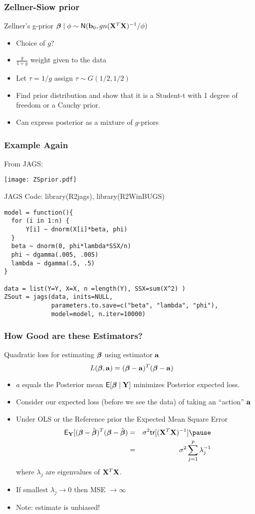 \documentclass[]{beamer}
\begin{document}
\begin{frame}
  \frametitle{Zellner-Siow prior}
Zellner's g-prior $\boldsymbol{\beta} \mid \phi \sim \textsf{N}(\mathbf{b}_0, g n 
    (\mathbf{X}^T\mathbf{X})^{-1}/\phi)$ \pause

\begin{itemize}
\item Choice of $g$?  \pause
\item $\frac{g}{1 + g}$  weight given to the data \pause
\item Let $\tau = 1/g$ assign $\tau \sim G(1/2, 1/2)$
\item Find prior distribution and show that it is a Student-t with 1
  degree of freedom or a Cauchy prior.
\item Can express posterior as a mixture of $g$-priors
\end{itemize}
\end{frame}

\begin{frame} \frametitle{Example Again}
  From JAGS:

\texttt{[image: ZSprior.pdf]}

\end{frame}

\begin{frame}[fragile]{JAGS Code: library(R2jags), library(R2WinBUGS)}
\begin{verbatim}
model = function(){
  for (i in 1:n) {
      Y[i] ~ dnorm(X[i]*beta, phi)
  }
  beta ~ dnorm(0, phi*lambda*SSX/n)
  phi ~ dgamma(.005, .005)
  lambda ~ dgamma(.5, .5)
}

data = list(Y=Y, X=X, n =length(Y), SSX=sum(X^2) )
ZSout = jags(data, inits=NULL, 
             parameters.to.save=c("beta", "lambda", "phi"), 
             model=model, n.iter=10000)
\end{verbatim}
\end{frame}
\begin{frame}
  \frametitle{How Good are these Estimators?}
Quadratic loss for estimating  $\boldsymbol{\beta}$ using estimator $\mathbf{a}$
$$ L(\boldsymbol{\beta}, \mathbf{a}) =  ( \boldsymbol{\beta} - \mathbf{a})^T(\boldsymbol{\beta} -\mathbf{a})$$ \pause

\begin{itemize}
\item $a$ equals the Posterior mean $\textsf{E}[\boldsymbol{\beta} \mid \mathbf{Y}]$ minimizes
  Posterior expected loss. \pause
\item Consider our expected loss (before we see the data) of taking an
``action'' $\mathbf{a}$ \pause
\item Under OLS or the  Reference prior the Expected Mean Square Error  \pause
  \begin{eqnarray*}
\E_\Y[( \b - \bhat)^T(\b -\bhat) & = &\sigma^2
  \tr[(\X^T\X)^{-1}] \pause \\
 & = & \sigma^2 \sum_{j=1}^p \lambda_j^{-1}
  \end{eqnarray*}
where $\lambda_j$ are eigenvalues of $\mathbf{X}^T\mathbf{X}$.
\pause
\item If smallest $\lambda_j \to 0$ then MSE  $\to \infty$
\item Note: estimate is unbiased! 
\end{itemize}
\end{frame}
\end{document}
